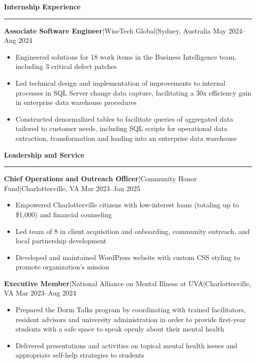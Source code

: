 \documentclass[11pt,letterpaper]{article}
\newcommand{\horibar}[2]{#1\hspace{5pt}|\hspace{5pt}#2}
\newcommand{\sep}[1]{\par\vspace{#1}}
\renewenvironment{section}[1]{
\sep{11pt}
{
\fontsize{14}{2}
\selectfont
\textbf{#1}\\[0.5pt]
}
\sep{4pt}
\noindent\rule{\linewidth}{0.5pt}
\sep{4pt}
}
{
}
\renewenvironment{subsection}[3]
{
\sep{4pt}
\horibar{\textbf{#1}}{#2} \hfill #3
\par\setstretch{1}
\begin{itemize}
}
{
\end{itemize}
\setstretch{0}
}
\begin{document}
\begin{section}{Internship Experience}
    \begin{subsection}{Associate Software Engineer}{\horibar{WiseTech Global}{Sydney, Australia}}{May 2024–Aug 2024}
        \item Engineered solutions for 18 work items in the Business Intelligence team, including 3 critical defect patches
        \item Led technical design and implementation of improvements to internal processes in SQL Server change data capture, facilitating a 30x efficiency gain in enterprise data warehouse procedures
        \item Constructed denormalized tables to facilitate queries of aggregated data tailored to customer needs, including SQL scripts for operational data extraction, transformation and loading into an enterprise data warehouse
    \end{subsection}
\end{section}

\begin{section}{Leadership and Service}
    \begin{subsection}{Chief Operations and Outreach Officer}{\horibar{Community Honor Fund}{Charlottesville, VA}}{Mar 2023–Jan 2025}
        \item Empowered Charlottesville citizens with low-interest loans (totaling up to \$1,000) and financial counseling
        \item Led team of 8 in client acquisition and onboarding, community outreach, and local partnership development
        \item Developed and maintained WordPress website with custom CSS styling to promote organization’s mission
    \end{subsection}
    \begin{subsection}{Executive Member}{\horibar{National Alliance on Mental Illness at UVA}{Charlottesville, VA}}{Mar 2023–Aug 2024}
        \item Prepared the Dorm Talks program by coordinating with trained facilitators, resident advisors and university administration in order to provide first-year students with a safe space to speak openly about their mental health
        \item Delivered presentations and activities on topical mental health issues and appropriate self-help strategies to students
    \end{subsection}
\end{section}
\end{document}
